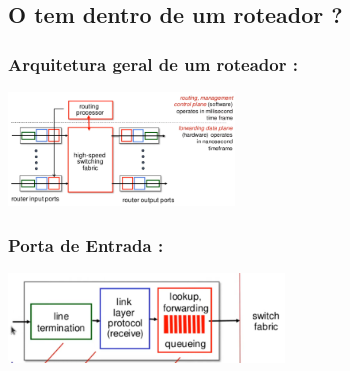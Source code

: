     \subsection{O tem dentro de um roteador ?}
        
        \subsubsection*{Arquitetura geral de um roteador :}
        
            \begin{center}
                \includegraphics[width=0.45\textwidth]{img/cap-04/arquitetura-geral-roteador.png}
            \end{center}

        \subsubsection*{Porta de Entrada :}
            
            \begin{center}
                \includegraphics[width=0.55\textwidth]{img/cap-04/porta-de-entrada.png}
            \end{center}

